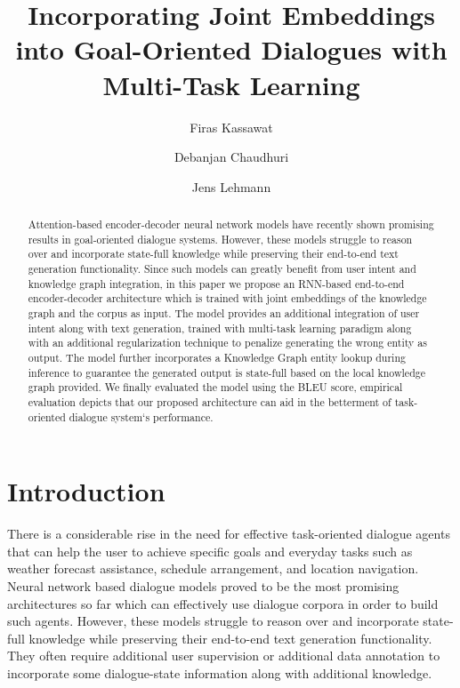 \documentclass[runningheads]{llncs}
\begin{document}
\title{Incorporating Joint Embeddings into Goal-Oriented Dialogues with Multi-Task Learning}

\author{Firas Kassawat   \and Debanjan Chaudhuri \and Jens Lehmann}


\maketitle              \begin{abstract}
Attention-based encoder-decoder neural network models have recently shown promising results in goal-oriented dialogue systems. However, these models struggle to reason over and incorporate state-full knowledge while preserving their end-to-end text generation functionality. Since such models can greatly benefit from user intent and knowledge graph integration, in this paper we propose an RNN-based end-to-end encoder-decoder architecture which is trained with joint embeddings of the knowledge graph and the corpus as input. The model provides an additional integration of user intent along with text generation, trained with multi-task learning paradigm along with an additional regularization technique to penalize generating the wrong entity as output. The model further incorporates a Knowledge Graph entity lookup during inference to guarantee the generated output is state-full based on the local knowledge graph provided. We finally evaluated the model using the BLEU score,  empirical evaluation depicts that our proposed architecture can aid in the betterment of task-oriented dialogue system`s performance.



\end{abstract}
\section{Introduction}
There is a considerable rise in the need for effective task-oriented dialogue agents that can help the user to achieve specific goals and everyday tasks such as weather forecast assistance, schedule arrangement, and location navigation. Neural network based dialogue models proved to be the most promising architectures so far which can effectively use dialogue corpora in order to build such agents. However, these models struggle to reason over and incorporate state-full knowledge while preserving their end-to-end text generation functionality. They often require additional user supervision or additional data annotation to incorporate some dialogue-state information along with additional knowledge.
\end{document}
